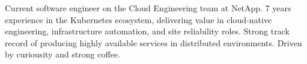

\begin{cvparagraph}

Current software engineer on the Cloud Engineering team at NetApp. 7 years experience in the Kubernetes ecosystem, delivering value in cloud-native engineering, infrastructure automation, and site reliability roles. Strong track record of producing highly available services in distributed environments. Driven by curiousity and strong coffee.

\end{cvparagraph}
